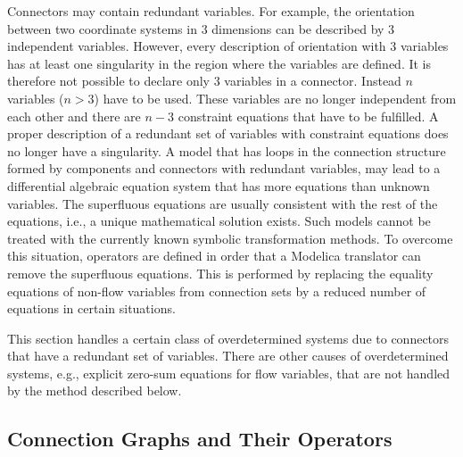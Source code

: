\begin{nonnormative}
Connectors may contain redundant variables.
For example, the orientation between two coordinate systems in $3$ dimensions can be described by $3$ independent variables.
However, every description of orientation with $3$ variables has at least one singularity in the region where the variables are defined.
It is therefore not possible to declare only $3$ variables in a connector.
Instead $n$ variables ($n > 3$) have to be used.
These variables are no longer independent from each other and there are $n - 3$ constraint equations that have to be fulfilled.
A proper description of a redundant set of variables with constraint equations does no longer have a singularity.
A model that has loops in the connection structure formed by components and connectors with redundant variables, may lead to a differential algebraic equation system that has more equations than unknown variables.
The superfluous equations are usually consistent with the rest of the equations, i.e., a unique mathematical solution exists.
Such models cannot be treated with the currently known symbolic transformation methods.
To overcome this situation, operators are defined in order that a Modelica translator can remove the superfluous equations.
This is performed by replacing the equality equations of non-flow variables from connection sets by a reduced number of equations in certain situations.

This section handles a certain class of overdetermined systems due to connectors that have a redundant set of variables.
There are other causes of overdetermined systems, e.g., explicit zero-sum equations for flow variables, that are not handled by the method described below.
\end{nonnormative}

\subsection{Connection Graphs and Their Operators}\label{overconstrained-equation-operators-for-connection-graphs}\label{connection-graphs-and-their-operators}


